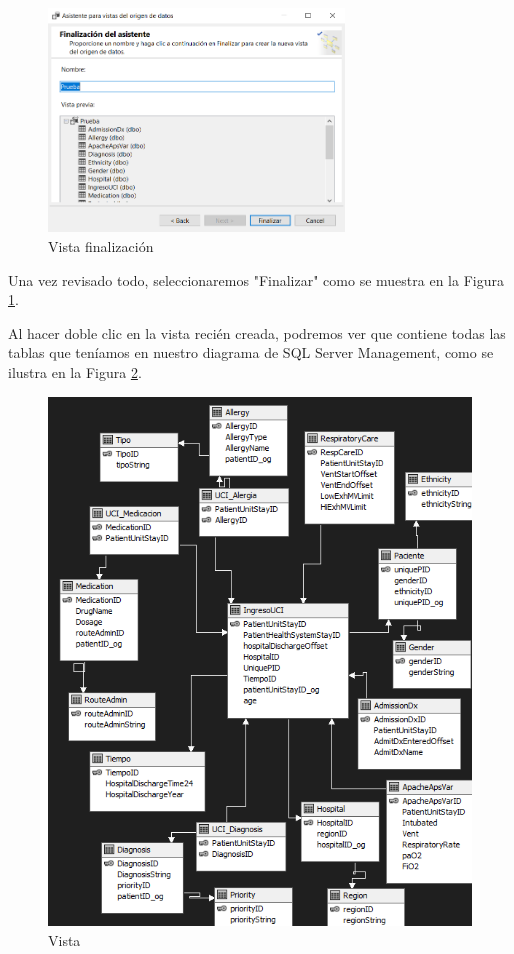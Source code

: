 \documentclass[12pt, a4paper, twoside]{article}
\begin{document}
\begin{figure}[H]
	\centering
	\includegraphics[width=0.7\textwidth]{image/asistenteVista}
	\caption{Vista finalización}
	\label{fig:6}
\end{figure}

Una vez revisado todo, seleccionaremos "Finalizar" como se muestra en la Figura \ref{fig:6}.

Al hacer doble clic en la vista recién creada, podremos ver que contiene todas las tablas que teníamos en nuestro diagrama de SQL Server Management, como se ilustra en la Figura \ref{fig:7}.

\begin{figure}[H]
	\centering
	\includegraphics[width=1\textwidth]{image/vista_origenes_datos}
	\caption{Vista}
	\label{fig:7}
\end{figure}
\end{document}
